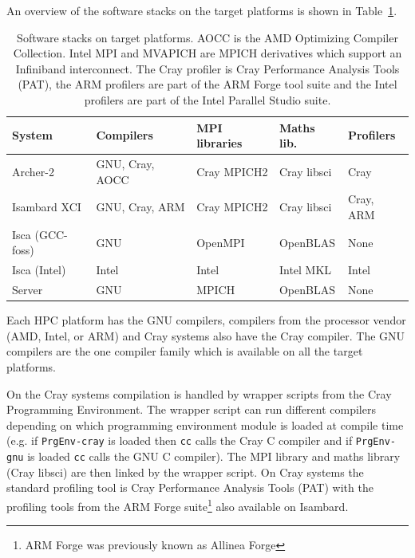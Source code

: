 \documentclass[a4paper,titlepage]{article}
\begin{document}
An overview of the software stacks on the target platforms is shown in Table~\ref{tab:software}. 
\begin{table}[htp]
\begin{center}
\begin{tabular}{|l|l|l|l|l|}
\hline 
System          & Compilers               & MPI libraries  & Maths lib.       & Profilers  \\
\hline
Archer-2        & GNU, Cray, AOCC         & Cray MPICH2     & Cray libsci     & Cray      \\
Isambard XCI    & GNU, Cray, ARM          & Cray MPICH2     & Cray libsci     & Cray, ARM \\
Isca (GCC-foss) & GNU                     & OpenMPI         & OpenBLAS        & None      \\
Isca (Intel)    & Intel                   & Intel           & Intel MKL       & Intel     \\
Server          & GNU                     & MPICH           & OpenBLAS        & None      \\
\hline
\end{tabular}
\end{center}
\caption{Software stacks on target platforms. AOCC is the AMD Optimizing Compiler Collection. Intel MPI and MVAPICH are MPICH derivatives which support an Infiniband interconnect.
The Cray profiler is Cray Performance Analysis Tools (PAT), the ARM profilers are part of the ARM Forge tool suite and the Intel profilers are part of the Intel Parallel Studio suite.}
\label{tab:software}
\end{table}
Each HPC platform has the GNU compilers, compilers from the processor vendor (AMD, Intel, or ARM) and Cray systems also have the Cray compiler. The GNU compilers are the one compiler family which is available on all the target platforms.

On the Cray systems compilation is handled by wrapper scripts from the Cray Programming Environment. The wrapper script can run different compilers depending on which programming environment module is loaded at compile time (e.g. if \texttt{PrgEnv-cray} is loaded then \texttt{cc} calls the Cray C compiler and if \texttt{PrgEnv-gnu} is loaded \texttt{cc} calls the GNU C compiler). The MPI library and maths library (Cray libsci) are then linked by the wrapper script. On Cray systems the standard profiling tool is Cray Performance Analysis Tools (PAT) with the profiling tools from the ARM Forge suite\footnote{ARM Forge was previously known as Allinea Forge} also available on Isambard.
\end{document}
